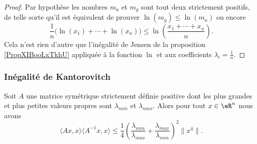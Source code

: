 \begin{proof}
    Par hypothèse les nombres \( m_a\) et \( m_g\) sont tout deux strictement positifs, de telle sorte qu'il est équivalent de prouver \( \ln(m_g)\leq \ln(m_a)\) ou encore
    \begin{equation}
        \frac{1}{ n }\big( \ln(x_1)+\cdots +\ln(x_n) \big)\leq \ln\left( \frac{ x_1+\cdots +x_n }{ n } \right).
    \end{equation}
    Cela n'est rien d'autre que l'inégalité de Jensen de la proposition \ref{PropXIBooLxTkhU} appliquée à la fonction \( \ln\) et aux coefficients \( \lambda_i=\frac{1}{ n }\).
\end{proof}

\subsubsection{Inégalité de Kantorovitch}

\begin{proposition}    \label{PropMNUooFbYkug}
    Soit \( A\) une matrice symétrique strictement définie positive dont les plus grandes et plus petites valeurs propres sont \( \lambda_{min}\) et \( \lambda_{max}\). Alors pour tout \( x\in \eR^n\) nous avons
    \begin{equation}
        \langle Ax, x\rangle \langle A^{-1}x, x\rangle \leq \frac{1}{ 4 }\left( \frac{ \lambda_{min} }{ \lambda_{max} }+\frac{ \lambda_{max} }{ \lambda_{min} } \right)^2\| x^4 \|.
    \end{equation}
\end{proposition}

